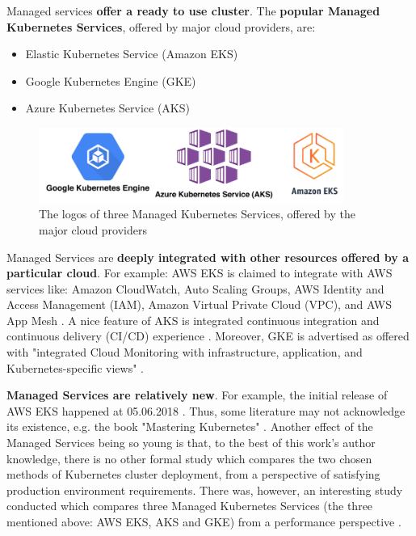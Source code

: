 Managed services \textbf{offer a ready to use cluster}. The \textbf{popular Managed Kubernetes Services}, offered by major cloud providers, are:
\begin{itemize}
\item Elastic Kubernetes Service (Amazon EKS) \cite{online-eks}
\item Google Kubernetes Engine (GKE) \cite{online-gke}
\item Azure Kubernetes Service (AKS) \cite{online-aks}
\end{itemize}

\begin{figure}[H]
    \centering
    \includegraphics[width=10cm]{figures/managed-k8s.png}
    \captionsetup{justification=centering,margin=2cm}
    \caption{The logos of three Managed Kubernetes Services, offered by the major cloud providers}
\end{figure}

Managed Services are \textbf{deeply integrated with other resources offered by a particular cloud}. For example: AWS EKS is claimed to integrate with AWS services like: Amazon CloudWatch, Auto Scaling Groups, AWS Identity and Access Management (IAM), Amazon Virtual Private Cloud (VPC), and AWS App Mesh \cite{online-eks}. A nice feature of AKS is integrated continuous integration and continuous delivery (CI/CD) experience \cite{online-aks}. Moreover, GKE is advertised as offered with "integrated Cloud Monitoring with infrastructure, application, and Kubernetes-specific views" \cite{online-gke}.

\textbf{Managed Services are relatively new}. For example, the initial release of AWS EKS happened at 05.06.2018 \cite{eks-history}. Thus, some literature may not acknowledge its existence, e.g. the book "Mastering Kubernetes" \cite{book-mastering-k8s}. Another effect of the Managed Services being so young is that, to the best of this work's author knowledge, there is no other formal study which compares the two chosen methods of Kubernetes cluster deployment, from a perspective of satisfying production environment requirements. There was, however, an interesting study conducted which compares three Managed Kubernetes Services (the three mentioned above: AWS EKS, AKS and GKE) from a performance perspective \cite{article-managed}.

